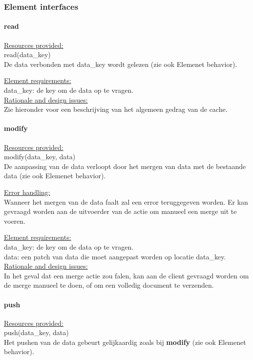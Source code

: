 \documentclass[a4paper,10pt]{article}
\begin{document}
\subsubsection{Element interfaces} 

\paragraph{read}

\underline{Resources provided:}\\
read(data\_key)\\
De data verbonden met data\_key wordt gelezen (zie ook Elemenet behavior).

\underline{Element requirements:}\\
data\_key: de key om de data op te vragen.\\

\underline{Rationale and design issues:}\\
Zie hieronder voor een beschrijving van het algemeen gedrag van de cache.

\paragraph{modify}
\underline{Resources provided:}\\
modify(data\_key, data)\\
De aanpassing van de data verloopt door het mergen van data met de bestaande data (zie ook Elemenet behavior).

\underline{Error handling:}\\
Wanneer het mergen van de data faalt zal een error teruggegeven worden.  Er kan gevraagd worden aan de uitvoerder van de actie om manueel een merge uit te voeren.

\underline{Element requirements:}\\
data\_key: de key om de data op te vragen.\\
data: een patch van data die moet aangepast worden op locatie data\_key.\\ 

\underline{Rationale and design issues:}\\
In het geval dat een merge actie zou falen, kan aan de client gevraagd worden om de merge manueel te doen, of om een volledig document te verzenden.

\paragraph{push}
\underline{Resources provided:}\\
push(data\_key, data)\\
Het pushen van de data gebeurt gelijkaardig zoals bij \textbf{modify}  (zie ook Elemenet behavior).
\end{document}
